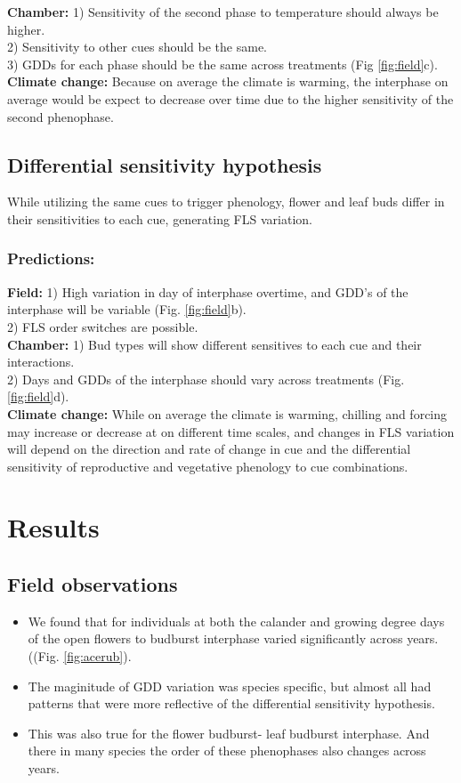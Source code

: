 \documentclass[11pt]{article}
\begin{document}
\noindent \textbf{Chamber:} 1) Sensitivity of the second phase to temperature should always be higher.\\ 2) Sensitivity to other cues should be the same.\\ 3) GDDs for each phase should be the same across treatments (Fig \ref{fig:field}c).\\

\noindent \textbf{Climate change:} Because on average the climate is warming, the interphase on average would be expect to decrease over time due to the higher sensitivity of the second phenophase.\\

\subsection{Differential sensitivity hypothesis}
\noindent While utilizing the same cues to trigger phenology, flower and leaf buds differ in their sensitivities to each cue, generating FLS variation.
\subsubsection{Predictions:}
\noindent \textbf{Field:} 1)  High variation in day of interphase overtime, and GDD's of the interphase will be variable (Fig. \ref{fig:field}b).\\ 2) FLS order switches are possible.\\

\noindent \textbf{Chamber:} 1)  Bud types will show different sensitives to each cue and their interactions.\\2) Days and GDDs of the interphase should vary across treatments (Fig. \ref{fig:field}d).\\

\noindent \textbf{Climate change:} While on average the climate is warming, chilling and forcing may increase or decrease at on different time scales, and changes in FLS variation will depend on the direction and rate of change in cue and the differential sensitivity of reproductive and vegetative phenology to cue combinations. \\

\section*{Results}
\subsection*{Field observations}
\begin{itemize}
\item We found that for individuals at both the calander and growing degree days of the open flowers to budburst interphase varied significantly across years. ((Fig. \ref{fig:acerub}).
\item The maginitude of GDD variation was species specific, but almost all had patterns that were more reflective of the differential sensitivity hypothesis.
\item This was also true for the flower budburst- leaf budburst interphase. And there in many species the order of these phenophases also changes across years.
\end{itemize}
\end{document}
